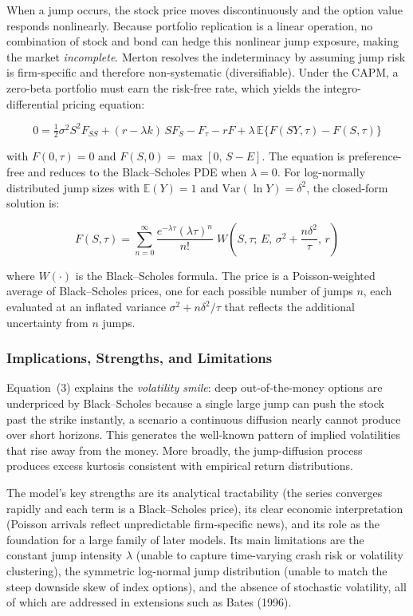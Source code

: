 \documentclass[12pt]{article}
\begin{document}
When a jump occurs, the stock price moves discontinuously and the option value responds
nonlinearly. Because portfolio replication is a linear operation, no combination of stock and
bond can hedge this nonlinear jump exposure, making the market \textit{incomplete}. Merton
resolves the indeterminacy by assuming jump risk is firm-specific and therefore
non-systematic (diversifiable). Under the CAPM, a zero-beta portfolio must earn the risk-free
rate, which yields the integro-differential pricing equation:

\begin{equation}
    0 = \tfrac{1}{2}\sigma^2 S^2 F_{SS} + (r - \lambda k)\,S F_S - F_\tau - rF
      + \lambda\,\mathbb{E}\bigl\{F(SY,\tau) - F(S,\tau)\bigr\}
\end{equation}

with $F(0,\tau)=0$ and $F(S,0)=\max[0,\,S-E]$. The equation is preference-free and reduces to
the Black--Scholes PDE when $\lambda=0$. For log-normally distributed jump sizes with
$\mathbb{E}(Y)=1$ and $\mathrm{Var}(\ln Y)=\delta^2$, the closed-form solution is:

\begin{equation}
    F(S,\tau) = \sum_{n=0}^{\infty}
    \frac{e^{-\lambda\tau}(\lambda\tau)^n}{n!}\;
    W\!\left(S,\tau;\,E,\,\sigma^2+\frac{n\delta^2}{\tau},\,r\right)
\end{equation}

where $W(\cdot)$ is the Black--Scholes formula. The price is a Poisson-weighted average of
Black--Scholes prices, one for each possible number of jumps $n$, each evaluated at an inflated
variance $\sigma^2 + n\delta^2/\tau$ that reflects the additional uncertainty from $n$ jumps.

\subsubsection*{Implications, Strengths, and Limitations}

Equation~(3) explains the \textit{volatility smile}: deep out-of-the-money options are
underpriced by Black--Scholes because a single large jump can push the stock past the strike
instantly, a scenario a continuous diffusion nearly cannot produce over short horizons. This
generates the well-known pattern of implied volatilities that rise away from the money. More
broadly, the jump-diffusion process produces excess kurtosis consistent with empirical return
distributions.

The model's key strengths are its analytical tractability (the series converges rapidly and
each term is a Black--Scholes price), its clear economic interpretation (Poisson arrivals
reflect unpredictable firm-specific news), and its role as the foundation for a large family
of later models. Its main limitations are the constant jump intensity $\lambda$ (unable to
capture time-varying crash risk or volatility clustering), the symmetric log-normal jump
distribution (unable to match the steep downside skew of index options), and the absence of
stochastic volatility, all of which are addressed in extensions such as Bates (1996).
\end{document}
